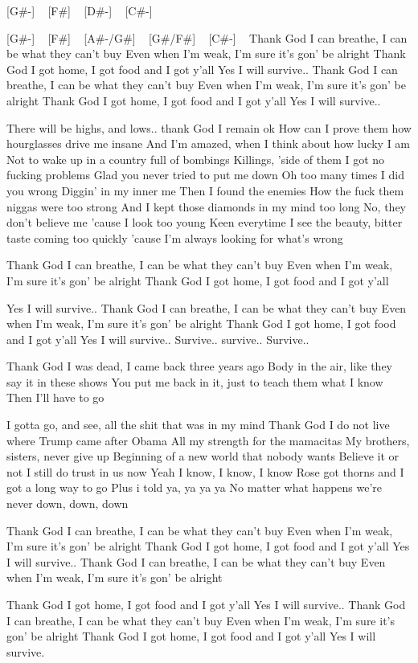 [G#-] ~ [F#] ~ [D#-] ~ [C#-] ~

[G#-] ~ [F#] ~ [A#-/G#]  ~ [G#/F#] ~ [C#-] ~
Thank God I can breathe, I can be what they can't buy
Even when I'm weak, I'm sure it's gon' be alright
Thank God I got home, I got food and I got y'all
Yes I will survive..
Thank God I can breathe, I can be what they can't buy
Even when I'm weak, I'm sure it's gon' be alright
Thank God I got home, I got food and I got y'all
Yes I will survive..

There will be highs, and lows.. thank God I remain ok
How can I prove them how hourglasses drive me insane
And I'm amazed, when I think about how lucky I am
Not to wake up in a country full of bombings
Killings, 'side of them I got no fucking problems
Glad you never tried to put me down
Oh too many times I did you wrong
Diggin' in my inner me
Then I found the enemies
How the fuck them niggas were too strong
And I kept those diamonds in my mind too long
No, they don't believe me 'cause I look too young
Keen everytime I see the beauty, bitter taste coming too quickly 'cause
I'm always looking for what's wrong

Thank God I can breathe, I can be what they can't buy
Even when I'm weak, I'm sure it's gon' be alright
Thank God I got home, I got food and I got y'all

Yes I will survive..
Thank God I can breathe, I can be what they can't buy
Even when I'm weak, I'm sure it's gon' be alright
Thank God I got home, I got food and I got y'all
Yes I will survive..
Survive.. survive..
Survive..

Thank God I was dead, I came back three years ago
Body in the air, like they say it in these shows
You put me back in it, just to teach them what I know
Then I'll have to go

I gotta go, and see, all the shit that was in my mind
Thank God I do not live where Trump came after Obama
All my strength for the mamacitas
My brothers, sisters, never give up
Beginning of a new world that nobody wants
Believe it or not I still do trust in us now
Yeah I know, I know, I know
Rose got thorns and I got a long way to go
Plus i told ya, ya ya ya
No matter what happens we're never down, down, down

Thank God I can breathe, I can be what they can't buy
Even when I'm weak, I'm sure it's gon' be alright
Thank God I got home, I got food and I got y'all
Yes I will survive..
Thank God I can breathe, I can be what they can't buy
Even when I'm weak, I'm sure it's gon' be alright

Thank God I got home, I got food and I got y'all
Yes I will survive..
Thank God I can breathe, I can be what they can't buy
Even when I'm weak, I'm sure it's gon' be alright
Thank God I got home, I got food and I got y'all
Yes I will survive.